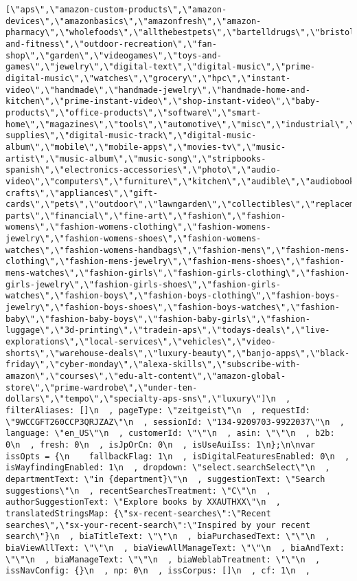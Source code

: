 \documentclass[
]{article}
\begin{document}
\begin{verbatim}
[\"aps\",\"amazon-custom-products\",\"amazon-devices\",\"amazonbasics\",\"amazonfresh\",\"amazon-pharmacy\",\"wholefoods\",\"allthebestpets\",\"bartelldrugs\",\"bristolfarms\",\"cardenas\",\"familyfare\",\"freshthyme\",\"kegnbottle\",\"missionwinespirits\",\"petfoodexpress\",\"savemart\",\"sousaswineliquors\",\"surdyksliquorcheeseshop\",\"weis\",\"stripbooks\",\"popular\",\"apparel\",\"electronics\",\"sporting\",\"sports-and-fitness\",\"outdoor-recreation\",\"fan-shop\",\"garden\",\"videogames\",\"toys-and-games\",\"jewelry\",\"digital-text\",\"digital-music\",\"prime-digital-music\",\"watches\",\"grocery\",\"hpc\",\"instant-video\",\"handmade\",\"handmade-jewelry\",\"handmade-home-and-kitchen\",\"prime-instant-video\",\"shop-instant-video\",\"baby-products\",\"office-products\",\"software\",\"smart-home\",\"magazines\",\"tools\",\"automotive\",\"misc\",\"industrial\",\"mi\",\"pet-supplies\",\"digital-music-track\",\"digital-music-album\",\"mobile\",\"mobile-apps\",\"movies-tv\",\"music-artist\",\"music-album\",\"music-song\",\"stripbooks-spanish\",\"electronics-accessories\",\"photo\",\"audio-video\",\"computers\",\"furniture\",\"kitchen\",\"audible\",\"audiobooks\",\"beauty\",\"shoes\",\"arts-crafts\",\"appliances\",\"gift-cards\",\"pets\",\"outdoor\",\"lawngarden\",\"collectibles\",\"replacement-parts\",\"financial\",\"fine-art\",\"fashion\",\"fashion-womens\",\"fashion-womens-clothing\",\"fashion-womens-jewelry\",\"fashion-womens-shoes\",\"fashion-womens-watches\",\"fashion-womens-handbags\",\"fashion-mens\",\"fashion-mens-clothing\",\"fashion-mens-jewelry\",\"fashion-mens-shoes\",\"fashion-mens-watches\",\"fashion-girls\",\"fashion-girls-clothing\",\"fashion-girls-jewelry\",\"fashion-girls-shoes\",\"fashion-girls-watches\",\"fashion-boys\",\"fashion-boys-clothing\",\"fashion-boys-jewelry\",\"fashion-boys-shoes\",\"fashion-boys-watches\",\"fashion-baby\",\"fashion-baby-boys\",\"fashion-baby-girls\",\"fashion-luggage\",\"3d-printing\",\"tradein-aps\",\"todays-deals\",\"live-explorations\",\"local-services\",\"vehicles\",\"video-shorts\",\"warehouse-deals\",\"luxury-beauty\",\"banjo-apps\",\"black-friday\",\"cyber-monday\",\"alexa-skills\",\"subscribe-with-amazon\",\"courses\",\"edu-alt-content\",\"amazon-global-store\",\"prime-wardrobe\",\"under-ten-dollars\",\"tempo\",\"specialty-aps-sns\",\"luxury\"]\n  , filterAliases: []\n  , pageType: \"zeitgeist\"\n  , requestId: \"9WCCGFT260CCP3QRJZAZ\"\n  , sessionId: \"134-9209703-9922037\"\n  , language: \"en_US\"\n  , customerId: \"\"\n  , asin: \"\"\n  , b2b: 0\n  , fresh: 0\n  , isJpOrCn: 0\n  , isUseAuiIss: 1\n};\n\nvar issOpts = {\n    fallbackFlag: 1\n  , isDigitalFeaturesEnabled: 0\n  , isWayfindingEnabled: 1\n  , dropdown: \"select.searchSelect\"\n  , departmentText: \"in {department}\"\n  , suggestionText: \"Search suggestions\"\n  , recentSearchesTreatment: \"C\"\n  , authorSuggestionText: \"Explore books by XXAUTHXX\"\n  , translatedStringsMap: {\"sx-recent-searches\":\"Recent searches\",\"sx-your-recent-search\":\"Inspired by your recent search\"}\n  , biaTitleText: \"\"\n  , biaPurchasedText: \"\"\n  , biaViewAllText: \"\"\n  , biaViewAllManageText: \"\"\n  , biaAndText: \"\"\n  , biaManageText: \"\"\n  , biaWeblabTreatment: \"\"\n  , issNavConfig: {}\n  , np: 0\n  , issCorpus: []\n  , cf: 1\n  , 
\end{verbatim}
\end{document}
